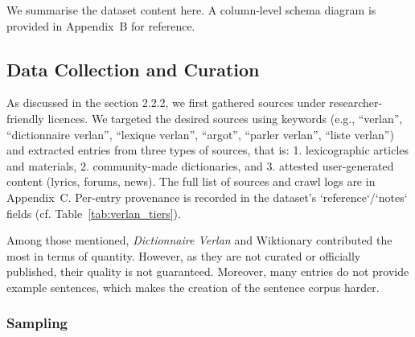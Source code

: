 \documentclass[12pt]{article}
\begin{document}
We summarise the dataset content here. A column-level schema diagram is provided in Appendix~B for reference.

\begin{table}[H]
\centering
\caption{Dataset at a glance (snapshot as of September 2025).}
\label{tab:dataset-glance}
\end{table}


\subsection{Data Collection and Curation}
As discussed in the section 2.2.2, we first gathered sources under researcher-friendly licences. We targeted the desired sources using keywords (e.g., ``verlan'', ``dictionnaire verlan'', ``lexique verlan'', ``argot'', ``parler verlan'', ``liste verlan'') and extracted entries from three types of sources, that is: 1. lexicographic articles and materials, 2. community-made dictionaries, and 3. attested user-generated content (lyrics, forums, news). The full list of sources and crawl logs are in Appendix~C. Per-entry provenance is recorded in the dataset's `reference`/`notes` fields (cf. Table~\ref{tab:verlan_tiers}).

Among those mentioned, \textit{Dictionnaire Verlan} and Wiktionary contributed the most in terms of quantity. However, as they are not curated or officially published, their quality is not guaranteed. Moreover, many entries do not provide example sentences, which makes the creation of the sentence corpus harder.

\subsubsection{Sampling}
\end{document}
